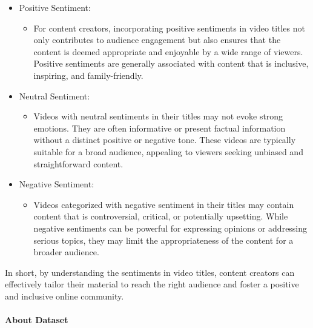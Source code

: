 \documentclass[12pt]{article}
\begin{document}
\begin{itemize}
\item Positive Sentiment:
\begin{itemize}
\item For content creators, incorporating positive sentiments in video titles not only contributes to audience engagement but also ensures that the content is deemed appropriate and enjoyable by a wide range of viewers. Positive sentiments are generally associated with content that is inclusive, inspiring, and family-friendly.
\end{itemize}
\item Neutral Sentiment:
\begin{itemize}
\item Videos with neutral sentiments in their titles may not evoke strong emotions. They are often informative or present factual information without a distinct positive or negative tone. These videos are typically suitable for a broad audience, appealing to viewers seeking unbiased and straightforward content.
\end{itemize}
\item Negative Sentiment:
\begin{itemize}
\item Videos categorized with negative sentiment in their titles may contain content that is controversial, critical, or potentially upsetting. While negative sentiments can be powerful for expressing opinions or addressing serious topics, they may limit the appropriateness of the content for a broader audience.
\end{itemize}
\end{itemize}
{In short, by understanding the sentiments in video titles, content creators can effectively tailor their material to reach the right audience and foster a positive and inclusive online community.}\\ \\
{\bf \large About Dataset}\\ \\
\end{document}
